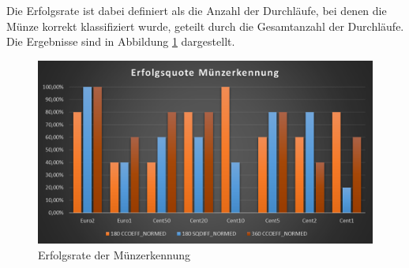 Die Erfolgsrate ist dabei definiert als die Anzahl der Durchläufe, bei denen die Münze korrekt klassifiziert wurde, geteilt durch die Gesamtanzahl der Durchläufe. Die Ergebnisse sind in Abbildung \ref{fig:SuccessRate} dargestellt.

\begin{figure}[ht]
    \centering
    \caption{Erfolgsrate der Münzerkennung}
    \label{fig:SuccessRate}
    \includegraphics[width=\textwidth]{../SuccessRate.png}  
\end{figure}
